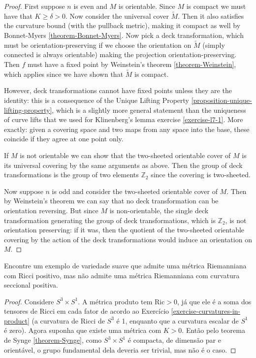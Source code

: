 \begin{proof}
First suppose $n$ is even and $M$ is
orientable. Since $M$ is compact we must
have that $K\geq \delta>0$. Now consider the
universal cover $\tilde{M}$. Then
it also satisfies the curvature bound (with
the pullback metric),
making it compact as well by Bonnet-Myers
\ref{theorem-Bonnet-Myers}.
Now pick a deck transformation, which must be
orientation-preserving if we choose the
orientation on $\tilde{M}$ (simply
connected is always orientable) making the
projection orientation-preserving.
Then $f$ must have a fixed point by
Weinstein's theorem \ref{theorem-Weinstein},
which applies since we have shown that
$\tilde{M}$ is compact.

However, deck transformations cannot have
fixed points unless they are the
identity: this is a consequence of the Unique
Lifting Property
 \ref{proposition-unique-lifting-property},
 which is a
slightly more general statement than the
uniqueness of curve lifts that we
used for Klinenberg's lemma exercise
\ref{exercise-l7-1}.
More exactly: given a covering space and two
maps from any space into the base,
these coincide if they agree at one point
only.

If $M$ is not orientable we can show that the
two-sheeted orientable cover of
$M$ is its universal covering by the same
arguments as above. Then the group of
deck transformations is the group of two
elements $\mathbb{Z}_2$ since the
covering is two-sheeted.

Now suppose $n$ is odd and consider the
two-sheeted orientable cover of $M$.
Then by Weinstein's theorem we can say that
no deck transformation can be
orientation reversing. But since $M$ is
non-orientable, the single deck
transformation generating the group of deck
transformations, which is
$\mathbb{Z}_2$, is not orientation
preserving: if it was, then the quotient of
the two-sheeted orientable covering by the
action of the deck transformations
would induce an orientation on $M$.
\end{proof}

\begin{exercise}
\label{exercise-posit-ricci-but-no-posit}
Encontre um exemplo de variedade suave que
admite uma métrica Riemanniana com
Ricci positivo, mas não admite uma métrica
Riemanniana com curvatura seccional
positiva.
\end{exercise}

\begin{proof}
Considere $S^3\times S^1$. A métrica produto
tem $\text{Ric}>0$, já que ele é a
soma dos tensores de Ricci em cada fator de
acordo ao Exercício
\ref{exercise-curvatures-in-product} (a
curvatura de Ricci de $S^3$ é 1,
enquanto que a curvatura escalar de $S^1$ é
zero). Agora suponha que existe uma
 métrica com $K>0$. Então pelo teorema de
 Synge \ref{theorem-Synge}, como
$S^3\times S^1$ é compacta, de dimensão par e
orientável, o grupo fundamental
dela deveria ser trivial, mas não é o caso.
\end{proof}

